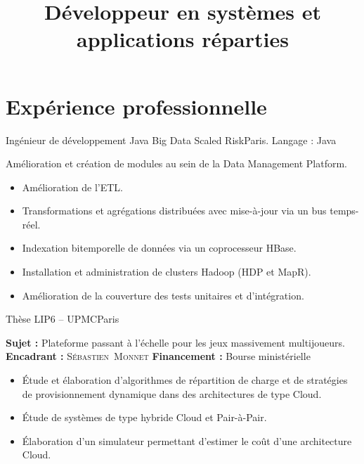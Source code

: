 \documentclass[11pt,a4paper,sans]{moderncv}
\title{Développeur en systèmes et applications réparties}
\begin{document}
\makecvtitle %
\vspace*{-0.5cm}


\section{Expérience professionnelle}
\vspace{1em}

        {Ingénieur de développement Java Big Data}
        {Scaled Risk}{Paris. Langage : Java}{}
        {
            Amélioration et création de modules au sein de la Data Management Platform.
            \begin{itemize}
                \item Amélioration de l'ETL.
                \item Transformations et agrégations distribuées avec mise-à-jour via un bus temps-réel.
                \item Indexation bitemporelle de données via un coprocesseur HBase.
                \item Installation et administration de clusters Hadoop (HDP et MapR).
                \item Amélioration de la couverture des tests unitaires et d'intégration.
            \end{itemize}
        }

\vspace{1em}

        {Thèse}
        {LIP6 -- UPMC}{Paris}{}
        {
            \textbf{Sujet :} Plateforme passant à l'échelle pour les jeux massivement multijoueurs.\endgraf
            \textbf{Encadrant :} \textsc{Sébastien~Monnet}\hfill
            \textbf{Financement :} Bourse ministérielle\hfill~\endgraf
            \begin{itemize}
                \item\'Etude et élaboration d'algorithmes de répartition de charge et de stratégies de provisionnement dynamique dans des architectures de type Cloud.
                \item\'Etude de systèmes de type hybride Cloud et Pair-à-Pair.
                \item\'Elaboration d'un simulateur permettant d'estimer le coût d'une architecture Cloud.
            \end{itemize}
        }
\end{document}
